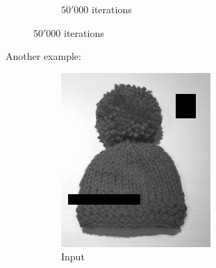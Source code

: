 \documentclass{paper}
\begin{document}
\begin{figure}[ht]
\begin{subfigure}[h]{0.3\textwidth}
	\caption*{$50'000$ iterations}
\end{subfigure}
\label{fig:results-cat}
\end{figure}
 
Another example:
\begin{figure}[ht]
\centering
\begin{subfigure}[h]{0.45\textwidth}
	\centering
	\includegraphics[width=\textwidth]{hat-input}
	\caption*{Input}
\end{subfigure}
~
\begin{subfigure}[h]{0.45\textwidth}
	\centering

\end{subfigure}
\end{figure}
\end{document}
